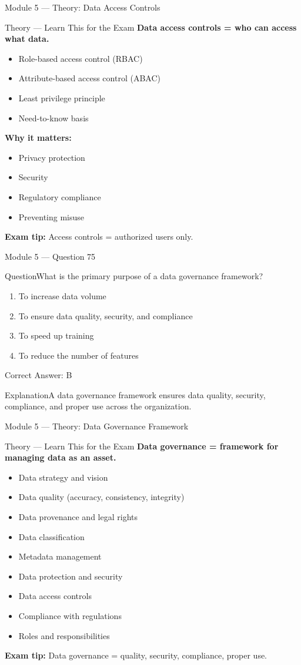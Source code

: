 \documentclass[aspectratio=169,10pt]{beamer}
\newcommand{\question}[1]{\begin{block}{Question}#1\end{block}}
\newcommand{\options}[4]{%
	\begin{enumerate}[label=\Alph*.,leftmargin=*]
		\item #1
		\item #2
		\item #3
		\item #4
	\end{enumerate}
}
\newcommand{\answerbox}[1]{\begin{exampleblock}{Correct Answer: #1}\end{exampleblock}}
\newcommand{\explain}[1]{\begin{block}{Explanation}#1\end{block}}
\newcommand{\theory}[1]{%
	\begin{block}{Theory --- Learn This for the Exam}
		\small #1
	\end{block}
}
\begin{document}
	\begin{frame}{Module 5 --- Theory: Data Access Controls}
		\theory{
			\textbf{Data access controls = who can access what data.}
			\begin{itemize}
				\item Role-based access control (RBAC)
				\item Attribute-based access control (ABAC)
				\item Least privilege principle
				\item Need-to-know basis
			\end{itemize}
			\textbf{Why it matters:}
			\begin{itemize}
				\item Privacy protection
				\item Security
				\item Regulatory compliance
				\item Preventing misuse
			\end{itemize}
			\textbf{Exam tip:} Access controls = authorized users only.
		}
	\end{frame}
	
	\begin{frame}{Module 5 --- Question 75}
		\question{What is the primary purpose of a data governance framework?}
		\options{To increase data volume}{To ensure data quality, security, and compliance}{To speed up training}{To reduce the number of features}
		\answerbox{B}
		\explain{A data governance framework ensures data quality, security, compliance, and proper use across the organization.}
	\end{frame}
	
	\begin{frame}{Module 5 --- Theory: Data Governance Framework}
		\theory{
			\textbf{Data governance = framework for managing data as an asset.}
			\begin{itemize}
				\item Data strategy and vision
				\item Data quality (accuracy, consistency, integrity)
				\item Data provenance and legal rights
				\item Data classification
				\item Metadata management
				\item Data protection and security
				\item Data access controls
				\item Compliance with regulations
				\item Roles and responsibilities
			\end{itemize}
			\textbf{Exam tip:} Data governance = quality, security, compliance, proper use.
		}
	\end{frame}
	
\end{document}
